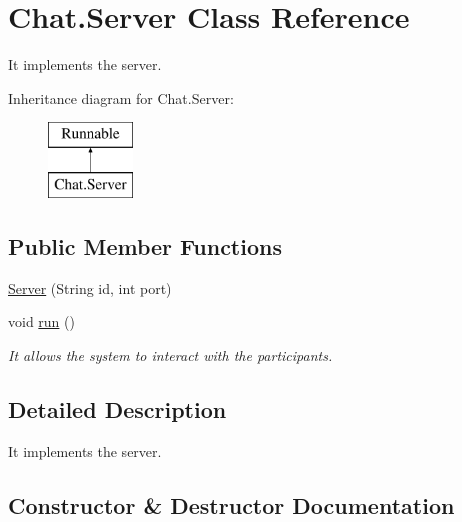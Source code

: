 \hypertarget{class_chat_1_1_server}{}\section{Chat.\+Server Class Reference}
\label{class_chat_1_1_server}


It implements the server.  


Inheritance diagram for Chat.\+Server\+:\begin{figure}[H]
\begin{center}
\leavevmode
\includegraphics[height=2.000000cm]{class_chat_1_1_server}
\end{center}
\end{figure}
\subsection*{Public Member Functions}
\begin{DoxyCompactItemize}
\item 
\hyperlink{class_chat_1_1_server_a40ee17c05416aed06445215afb74effe}{Server} (String id, int port)
\item 
void \hyperlink{class_chat_1_1_server_a90f3bd24ca99aa3ebf510d1f41b245c3}{run} ()
\begin{DoxyCompactList}\small\item\em It allows the system to interact with the participants. \end{DoxyCompactList}\end{DoxyCompactItemize}


\subsection{Detailed Description}
It implements the server. 

\subsection{Constructor \& Destructor Documentation}
\hypertarget{class_chat_1_1_server_a40ee17c05416aed06445215afb74effe}{}\label{class_chat_1_1_server_a40ee17c05416aed06445215afb74effe} 
